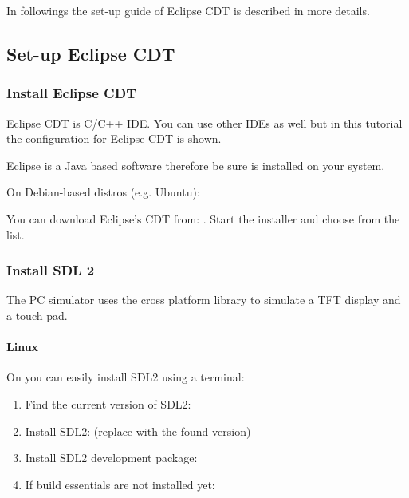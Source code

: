 \documentclass[letterpaper,10pt,english]{sphinxmanual}
\begin{document}
In followings the set-up guide of Eclipse CDT is described in more details.


\subsection{Set-up Eclipse CDT}
\label{\detokenize{get-started/pc-simulator:set-up-eclipse-cdt}}

\subsubsection{Install Eclipse CDT}
\label{\detokenize{get-started/pc-simulator:install-eclipse-cdt}}
Eclipse CDT is C/C++ IDE. You can use other IDEs as well but in this tutorial the configuration for Eclipse CDT is shown.

Eclipse is a Java based software therefore be sure  is installed on your system.

On Debian-based distros (e.g. Ubuntu): 

You can download Eclipse’s CDT from: . Start the installer and choose  from the list.


\subsubsection{Install SDL 2}
\label{\detokenize{get-started/pc-simulator:install-sdl-2}}
The PC simulator uses the  cross platform library to simulate a TFT display and a touch pad.


\paragraph{Linux}
\label{\detokenize{get-started/pc-simulator:linux}}
On  you can easily install SDL2 using a terminal:
\begin{enumerate}
\def\theenumi{\arabic{enumi}}
\def\labelenumi{\theenumi .}
\makeatletter\def\p@enumii{\p@enumi \theenumi .}\makeatother
\item {} 
Find the current version of SDL2: 

\item {} 
Install SDL2:  (replace with the found version)

\item {} 
Install SDL2 development package: 

\item {} 
If build essentials are not installed yet: 

\end{enumerate}
\end{document}
